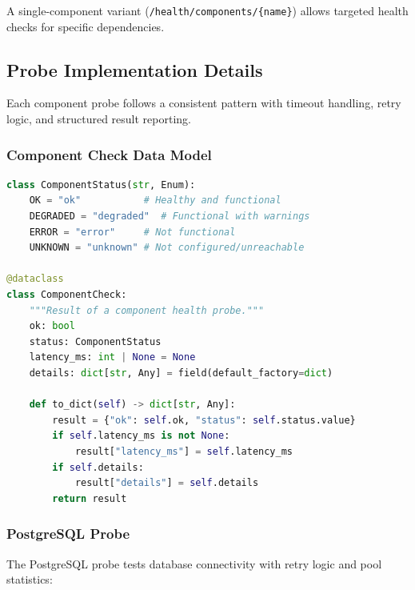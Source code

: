 A single-component variant (\texttt{/health/components/\{name\}}) allows targeted health checks for specific dependencies.

\subsection{Probe Implementation Details}
\label{subsec:probe-implementation}

Each component probe follows a consistent pattern with timeout handling, retry logic, and structured result reporting.

\subsubsection{Component Check Data Model}

\begin{lstlisting}[language=Python, caption={ComponentCheck dataclass}]
class ComponentStatus(str, Enum):
    OK = "ok"           # Healthy and functional
    DEGRADED = "degraded"  # Functional with warnings
    ERROR = "error"     # Not functional
    UNKNOWN = "unknown" # Not configured/unreachable

@dataclass
class ComponentCheck:
    """Result of a component health probe."""
    ok: bool
    status: ComponentStatus
    latency_ms: int | None = None
    details: dict[str, Any] = field(default_factory=dict)
    
    def to_dict(self) -> dict[str, Any]:
        result = {"ok": self.ok, "status": self.status.value}
        if self.latency_ms is not None:
            result["latency_ms"] = self.latency_ms
        if self.details:
            result["details"] = self.details
        return result
\end{lstlisting}

\subsubsection{PostgreSQL Probe}

The PostgreSQL probe tests database connectivity with retry logic and pool statistics:

